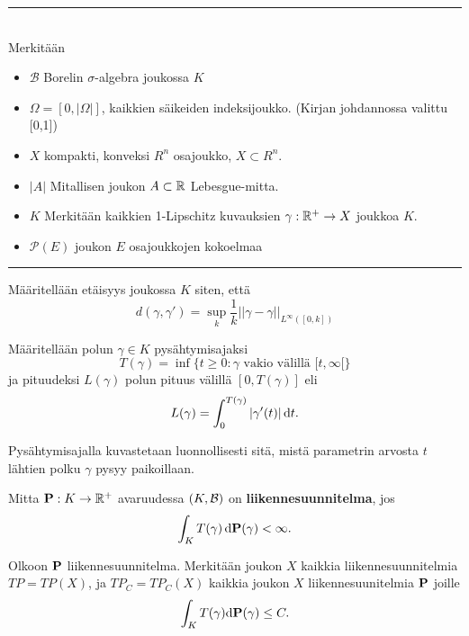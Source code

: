 

\hrule $\color{white}{.}$ \\
Merkitään 
\begin{itemize}
    \item $\mathcal{B}$ Borelin $\sigma$-algebra joukossa $K$
    \item $\Omega = [0,|\Omega|]$, kaikkien säikeiden indeksijoukko. (Kirjan johdannossa valittu [0,1])
    \item $X$ kompakti, konveksi $R^n$ osajoukko, $X \subset R^n$.
    \item $|A|$ Mitallisen joukon $A\subset \R$ Lebesgue-mitta.
    \item $K$ Merkitään kaikkien 1-Lipschitz kuvauksien $\gamma:\R^+ \to X$ joukkoa $K$. 
    \item $\mathcal{P}(E)$ joukon $E$ osajoukkojen kokoelmaa
\end{itemize}
\hrule


\begin{definition}
    Määritellään etäisyys joukossa $K$ siten, että
    \[d(\gamma, \gamma') = \sup_k \frac{1}{k}||\gamma - \gamma||_{L^\infty([0,k])}\]
\end{definition}

\begin{definition}
    Määritellään polun $\gamma \in K$ pysähtymisajaksi 
    \begin{equation*}
        T(\gamma) = \inf\{t\ge0:\gamma \text{ vakio välillä } [t,\infty[ \}
    \end{equation*}
    ja pituudeksi $L(\gamma)$ polun pituus välillä $[0, T(\gamma)]$ eli
     \begin{equation*}
         L(\gamma) = \int_0^{T(\gamma)}|\gamma'(t)|\, \dt.
     \end{equation*}
\end{definition}

Pysähtymisajalla kuvastetaan luonnollisesti sitä, mistä parametrin arvosta $t$ lähtien polku $\gamma$ pysyy paikoillaan. 

\begin{definition}\label{def:liikennesuunnitelma}
    Mitta $\P: K \to \R^+$ avaruudessa  $(K, \Borel)$ on \textbf{liikennesuunnitelma}, jos
    \begin{equation*}
     \int_K T(\gamma) \, \d \P (\gamma) < \infty.   
    \end{equation*}
\end{definition}

\begin{definition}
    Olkoon $\P$ liikennesuunnitelma. Merkitään joukon $X$ kaikkia liikennesuunnitelmia $TP = TP(X)$, ja $TP_C = TP_C(X)$ kaikkia joukon $X$ liikennesuunitelmia $\P$ joille
    \begin{equation*}
        \int_K T(\gamma) \d \P(\gamma) \le C.
    \end{equation*}
\end{definition}

